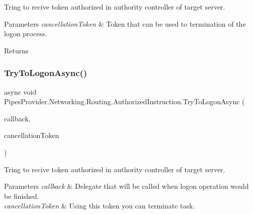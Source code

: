Tring to recive token authorized in authority controller of target server. 


\begin{DoxyParams}{Parameters}
{\em cancellation\+Token} & Token that can be used to termination of the logon process.\\
\hline
\end{DoxyParams}
\begin{DoxyReturn}{Returns}

\end{DoxyReturn}
\mbox{\label{class_pipes_provider_1_1_networking_1_1_routing_1_1_authorized_instruction_a20e94ddf386abb937f4c725a094dc050}} 
\subsubsection{\texorpdfstring{Try\+To\+Logon\+Async()}{TryToLogonAsync()}}
{\footnotesize\ttfamily async void Pipes\+Provider.\+Networking.\+Routing.\+Authorized\+Instruction.\+Try\+To\+Logon\+Async (\begin{DoxyParamCaption}\item[{System.\+Action$<$ \mbox{\hyperlink{class_pipes_provider_1_1_networking_1_1_routing_1_1_authorized_instruction}{Authorized\+Instruction}} $>$}]{callback,  }\item[{Cancellation\+Token}]{cancellation\+Token }\end{DoxyParamCaption})}



Tring to recive token authorized in authority controller of target server. 


\begin{DoxyParams}{Parameters}
{\em callback} & Delegate that will be called when logon operation would be finished.\\
\hline
{\em cancellation\+Token} & Using this token you can terminate task.\\
\hline
\end{DoxyParams}


